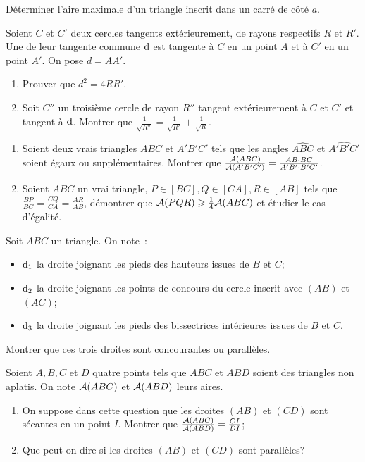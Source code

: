 \begin{exercice}
    Déterminer l'aire maximale d'un triangle inscrit dans un carré de côté \(a\).
\end{exercice}
\begin{exercice}
    Soient \(C\) et \(C'\) deux cercles tangents extérieurement, de rayons respectifs \(R\) et \(R'\). Une de leur tangente commune \(\mathrm{d}\) est tangente à \(C\) en un point \(A\) et à \(C'\) en un point \(A'\). On pose \(d=AA'\).
    \begin{enumerate}
        \item Prouver que \(d^2 = 4RR'\).
        \item Soit \(C''\) un troisième cercle de rayon \(R''\) tangent extérieurement à \(C\) et \(C'\) et tangent à \(\mathrm{d}\). Montrer que \(\frac{1}{\sqrt{R''}} = \frac{1}{\sqrt{R'}} + \frac{1}{\sqrt{R}}\).
    \end{enumerate}
\end{exercice}
\begin{exercice}
    \begin{enumerate}
    \item Soient deux vrais triangles \(ABC\) et \(A'B'C'\) tels que les angles \(\widehat{ABC}\) et \(\widehat{A'B'C'}\) soient égaux ou supplémentaires. Montrer que \(\frac{\mathcal{A}(ABC)}{\mathcal{A}(A'B'C')} = \frac{AB \cdot BC}{A'B' \cdot B'C'}\).
    \item Soient \(ABC\) un vrai triangle, \(P \in [BC], Q \in [CA], R \in [AB]\) tels que \(\frac{BP}{BC} = \frac{CQ}{CA} = \frac{AR}{AB}\), démontrer que \(\mathcal{A}(PQR) \geqslant \frac{1}{4} \mathcal{A}(ABC)\) et étudier le cas d'égalité.
    \end{enumerate}
\end{exercice}
\begin{exercice}
    Soit \(ABC\) un triangle. On note~:
    \begin{itemize}
        \item \(\mathrm{d}_1\) la droite joignant les pieds des hauteurs issues de \(B\) et \(C\);
        \item \(\mathrm{d}_2\) la droite joignant les points de concours du cercle inscrit avec \((AB)\) et \((AC)\);
        \item \(\mathrm{d}_3\) la droite joignant les pieds des bissectrices intérieures issues de \(B\) et \(C\).
    \end{itemize}
    Montrer que ces trois droites sont concourantes ou parallèles.
\end{exercice}
\begin{exercice}
    Soient \(A, B, C\) et \(D\) quatre points tels que \(ABC\) et \(ABD\) soient des triangles non aplatis. On note \(\mathcal{A}(ABC)\) et \(\mathcal{A}(ABD)\) leurs aires.
    \begin{enumerate}
        \item On suppose dans cette question que les droites \((AB)\) et \((CD)\) sont sécantes en un point \(I\). Montrer que \(\frac{\mathcal{A}(ABC)}{\mathcal{A}(ABD)} = \frac{CI}{DI}\);
        \item Que peut on dire si les droites \((AB)\) et \((CD)\) sont parallèles?
    \end{enumerate}
\end{exercice}
